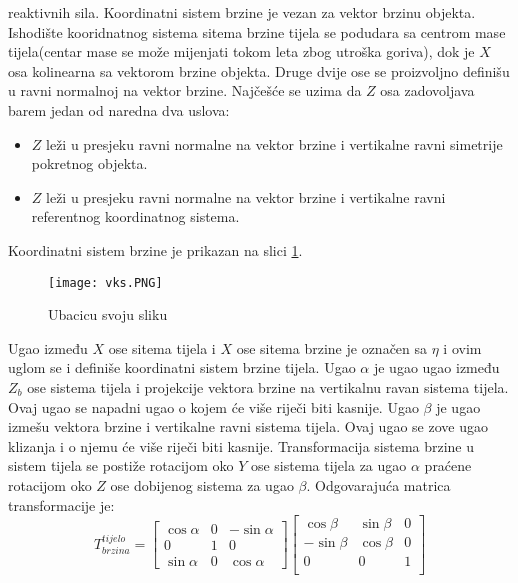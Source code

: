 reaktivnih sila. Koordinatni sistem brzine je vezan za vektor brzinu objekta. Ishodište kooridnatnog sistema 
sitema brzine tijela se podudara sa centrom mase tijela(centar mase se može mijenjati tokom leta zbog utroška goriva), dok 
je $X$ osa kolinearna sa vektorom brzine objekta. Druge dvije ose se proizvoljno definišu u ravni 
normalnoj na vektor brzine. Najčešće se uzima da $Z$ osa zadovoljava barem jedan od naredna dva uslova:
\begin{itemize}
    \item $Z$ leži u presjeku ravni normalne na vektor brzine i vertikalne ravni simetrije pokretnog objekta.
    \item $Z$ leži u presjeku ravni normalne na vektor brzine i vertikalne ravni referentnog koordinatnog sistema.
\end{itemize}
Koordinatni sistem brzine je prikazan na slici \ref{fig:vks}.
\begin{figure}[!ht]
    \centering
    \texttt{[image: vks.PNG]}
    \caption{Ubacicu svoju sliku}
    \label{fig:vks}
\end{figure}
Ugao između $X$ ose sitema tijela i $X$ ose sitema brzine je označen sa $\eta$ i ovim uglom se i definiše 
koordinatni sistem brzine tijela. Ugao $\alpha$ je ugao ugao između $Z_b$ ose  sistema tijela i projekcije 
vektora brzine na vertikalnu ravan sistema tijela. Ovaj ugao se napadni ugao o kojem će više riječi biti kasnije. 
Ugao $\beta$ je ugao izmešu vektora brzine i vertikalne ravni sistema tijela. Ovaj ugao se zove ugao klizanja i o njemu će 
više riječi biti kasnije. Transformacija sistema brzine u sistem tijela se postiže rotacijom 
oko $Y$ ose sistema tijela za ugao $\alpha$ praćene rotacijom oko $Z$ ose dobijenog sistema za ugao $\beta$. 
Odgovarajuća matrica transformacije je:
\begin{equation}
    T_{brzina}^{tijelo} = \begin{bmatrix}
        \cos\alpha & 0 & -\sin\alpha \\
        0& 1& 0\\
        \sin\alpha & 0 & \cos\alpha
    \end{bmatrix}
    \begin{bmatrix}
        \cos\beta & \sin\beta & 0\\
        -\sin\beta & \cos\beta & 0\\
        0 & 0& 1\\
    \end{bmatrix}
    \label{eq:VtoB}
\end{equation}
